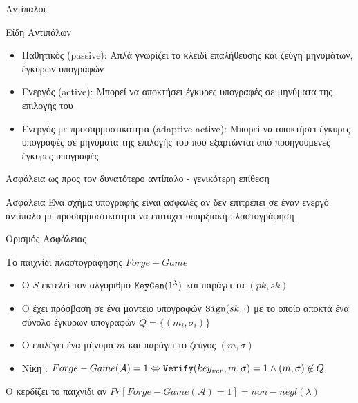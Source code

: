 \documentclass{beamer}
\begin{document}
\begin{frame}[allowframebreaks]{Αντίπαλοι}
\begin{block}{Είδη Αντιπάλων}
\begin{itemize}
\item Παθητικός (passive): Απλά γνωρίζει το κλειδί επαλήθευσης και ζεύγη μηνυμάτων, έγκυρων υπογραφών
\item Ενεργός (active): Μπορεί να αποκτήσει έγκυρες υπογραφές σε μηνύματα της επιλογής του
\item Ενεργός με προσαρμοστικότητα (adaptive active): Μπορεί να αποκτήσει έγκυρες υπογραφές σε μηνύματα της επιλογής του που εξαρτώνται από προηγουμενες έγκυρες υπογραφές
\end{itemize}
\end{block}
\framebreak
Ασφάλεια ως προς τον δυνατότερο αντίπαλο - γενικότερη επίθεση

\begin{block}{Ασφάλεια}
Ένα σχήμα υπογραφής είναι ασφαλές αν δεν επιτρέπει σε έναν ενεργό αντίπαλο με προσαρμοστικότητα να επιτύχει υπαρξιακή πλαστογράφηση 
\end{block}
\end{frame}


\begin{frame}{Ορισμός Ασφάλειας}
\begin{block}{Το παιχνίδι πλαστογράφησης $Forge-Game$}
\begin{itemize}
\item Ο $S$ εκτελεί τον αλγόριθμο $\mathtt{KeyGen}(1^\lambda)$ και παράγει τα $(pk,sk)$
\pause
\item Ο \adv έχει πρόσβαση σε ένα μαντειο υπογραφών $\mathtt{Sign}(sk,\cdot)$ με το οποίο αποκτά ένα σύνολο έγκυρων υπογραφών $Q = \{(m_i, \sigma_i)\}$ \\
\pause
{}
\pause
\item O \adv επιλέγει ένα μήνυμα $m$ και παράγει το ζεύγος $(m, \sigma)$ 
\pause
\item Νίκη \adv: $Forge-Game(\mathcal{A}) = 1 \Leftrightarrow \mathtt{Verify}(key_{ver}, m, \sigma)=1 \wedge (m, \sigma) \not \in Q$
\end{itemize}
\end{block}
\pause
O \adv κερδίζει το παιχνίδι αν $Pr[Forge-Game(\mathcal{A})=1] = non-negl(\lambda)$
\end{frame}
\end{document}
